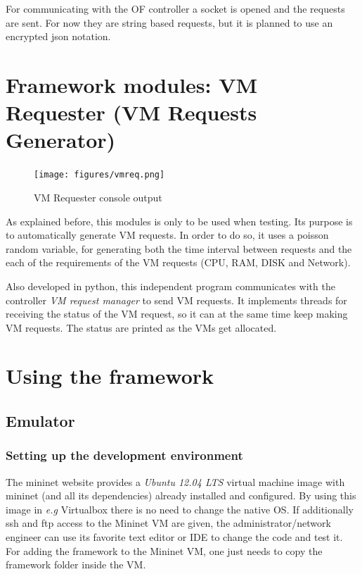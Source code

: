 \documentclass[12pt,english,oneside]{book}
\begin{document}
For communicating with the OF controller a socket is opened and the requests are sent. For now they are string based requests, but it is planned to use an encrypted json\cite{JSON} notation.

\newpage
\section{Framework modules: VM Requester (VM Requests Generator)}
\hspace{0.6cm}

\begin{figure}[h!tbp]
        \centering
        \texttt{[image: figures/vmreq.png]}
        \caption{VM Requester console output}
        \label{fig:vmreq}
\end{figure}

As explained before, this modules is only to be used when testing. Its purpose is to automatically generate VM requests.
In order to do so, it uses a poisson random variable, for generating both the time interval between requests and the each of the requirements of the VM requests (CPU, RAM, DISK and Network).

Also developed in python, this independent program communicates with the controller \textit{VM request manager} to send VM requests.
It implements threads for receiving the status of the VM request, so it can at the same time keep making VM requests. The status are printed as the VMs get allocated.

\newpage

\section{Using the framework}

\subsection{Emulator}

\subsubsection{Setting up the development environment}
\hspace{0.6cm}

The mininet website provides a \textit{Ubuntu 12.04 LTS} virtual machine image with mininet (and all its dependencies) already installed and configured. By using this image in \textit{e.g} Virtualbox\cite{vbox} there is no need to change the native OS. If additionally ssh and ftp access to the Mininet VM are given, the administrator/network engineer can use its favorite text editor or IDE to change the code and test it.
For adding the framework to the Mininet VM, one just needs to copy the framework folder inside the VM.
\end{document}
